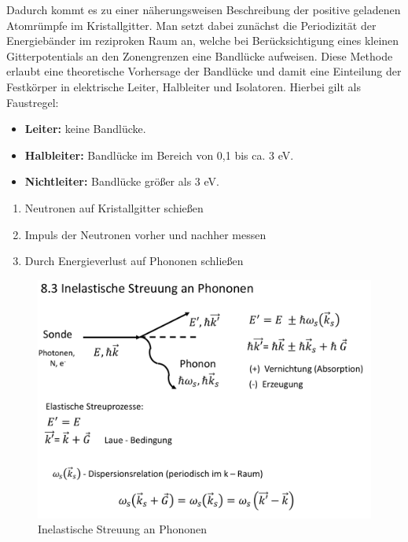 Dadurch kommt es zu einer näherungsweisen Beschreibung der positive geladenen Atomrümpfe im Kristallgitter. Man setzt dabei zunächst die Periodizität der Energiebänder im reziproken Raum an, welche bei Berücksichtigung eines kleinen Gitterpotentials an den Zonengrenzen eine Bandlücke aufweisen. 
Diese Methode erlaubt eine theoretische Vorhersage der Bandlücke und damit eine Einteilung der Festkörper in elektrische Leiter, Halbleiter und Isolatoren.
Hierbei gilt als Faustregel:

\begin{itemize}
    \item \textbf{Leiter:} keine Bandlücke.
    \item \textbf{Halbleiter:} Bandlücke im Bereich von 0,1 bis ca. 3 eV.
    \item \textbf{Nichtleiter:} Bandlücke größer als 3 eV.
\end{itemize}

\label{q:6}

\begin{enumerate}
    \item Neutronen auf Kristallgitter schießen
    \item Impuls der Neutronen vorher und nachher messen
    \item Durch Energieverlust auf Phononen schließen
\end{enumerate}

\begin{figure}[H]  
    \centering
    \includegraphics[width=.8\textwidth]{resources/05-01-2015/Frage6_1.png}
    \caption{Inelastische Streuung an Phononen}
\end{figure}

